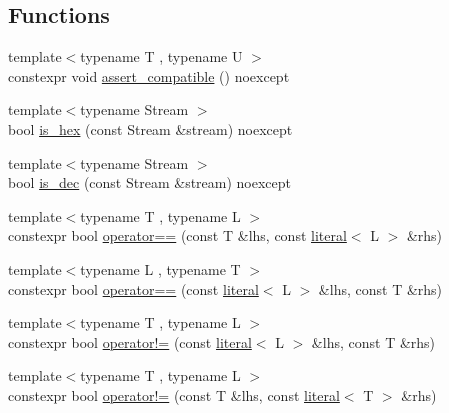 \subsection*{Functions}
\begin{DoxyCompactItemize}
\item 
{\footnotesize template$<$typename T , typename U $>$ }\\constexpr void \mbox{\hyperlink{namespacedistant_1_1utility_adaed2f252742877036ba3c936d9b436c}{assert\+\_\+compatible}} () noexcept
\item 
{\footnotesize template$<$typename Stream $>$ }\\bool \mbox{\hyperlink{namespacedistant_1_1utility_acdbbfda9345d09ca6fc5206c6268e3e2}{is\+\_\+hex}} (const Stream \&stream) noexcept
\item 
{\footnotesize template$<$typename Stream $>$ }\\bool \mbox{\hyperlink{namespacedistant_1_1utility_a555ff7ab9537f1ab2ec83d4e1f791ef5}{is\+\_\+dec}} (const Stream \&stream) noexcept
\item 
{\footnotesize template$<$typename T , typename L $>$ }\\constexpr bool \mbox{\hyperlink{namespacedistant_1_1utility_af5871a624732649e33373fc90355cd46}{operator==}} (const T \&lhs, const \mbox{\hyperlink{classdistant_1_1utility_1_1literal}{literal}}$<$ L $>$ \&rhs)
\item 
{\footnotesize template$<$typename L , typename T $>$ }\\constexpr bool \mbox{\hyperlink{namespacedistant_1_1utility_aab2e7014d7013e44ed3890a4189c46b9}{operator==}} (const \mbox{\hyperlink{classdistant_1_1utility_1_1literal}{literal}}$<$ L $>$ \&lhs, const T \&rhs)
\item 
{\footnotesize template$<$typename T , typename L $>$ }\\constexpr bool \mbox{\hyperlink{namespacedistant_1_1utility_a89c1a1b05b4b8183ae5e6d1469e5d9e8}{operator!=}} (const \mbox{\hyperlink{classdistant_1_1utility_1_1literal}{literal}}$<$ L $>$ \&lhs, const T \&rhs)
\item 
{\footnotesize template$<$typename T , typename L $>$ }\\constexpr bool \mbox{\hyperlink{namespacedistant_1_1utility_a749461c752fcab50ca1c5d94a5951419}{operator!=}} (const T \&lhs, const \mbox{\hyperlink{classdistant_1_1utility_1_1literal}{literal}}$<$ T $>$ \&rhs)
\end{DoxyCompactItemize}
